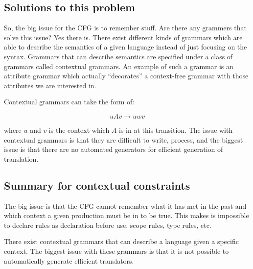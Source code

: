 \subsection{Solutions to this problem}
So, the big issue for the CFG is to remember stuff. Are there any grammers that
solve this issue? Yes there is. There exist different kinds of grammars which
are able to describe the semantics of a given language instead of just focusing
on the syntax. Grammars that can describe semantics are specified under a class
of grammars called contextual grammars.
\cite{plpp}
An example of such a grammar is an attribute grammar which actually
``decorates'' a context-free grammar with those attributes we are interested in.
\cite{attrgrammar}

Contextual grammars can take the form of:

\[
  uAv \rightarrow uwv
\]

where $u$ and $v$ is the context which $A$ is in at this transition.  The issue
with contextual grammars is that they are difficult to write, process, and the
biggest issue is that there are no automated generators for efficient generation
of translation.
\cite{attrgrammar}

\subsection{Summary for contextual constraints}
The big issue is that the CFG cannot remember what it has met in the past and
which context a given production must be in to be true. This makes is impossible
to declare rules as declaration before use, scope rules, type rules, etc.

There exist contextual grammars that can describe a language given a specific
context. The biggest issue with these grammars is that it is not possible to
automatically generate efficient translators.

